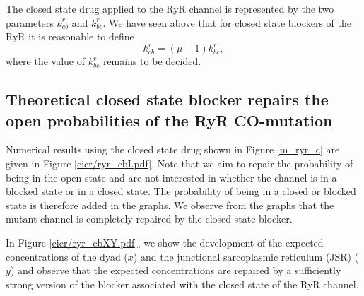 The closed state drug applied to the RyR channel is represented by the two
parameters $k_{cb}^{r}$ and $k_{bc}^{r}.$ We have seen above that for closed
state blockers of the RyR it is reasonable to define%
\[
k_{cb}^{r}=\left(  \mu-1\right)  k_{bc}^{r},%
\]
where the value of $k_{bc}^{r}$ remains to be decided. 

\subsection{Theoretical closed state blocker repairs the open probabilities of the RyR CO-mutation}

Numerical results using the closed state drug shown in Figure \ref{m_ryr_c} are given 
in Figure \ref{cicr/ryr_cbI.pdf}. Note that we aim to repair the probability of being in the open state and are not interested in whether the channel is in a blocked state or in a closed state. The probability of being in a closed or blocked state is therefore 
added in the graphs. We observe from the graphs that 
the mutant channel is completely repaired by the closed state blocker.

In Figure \ref{cicr/ryr_cbXY.pdf}, we show the development of the expected concentrations of the dyad ($x$) and the junctional sarcoplasmic reticulum  (JSR) ($y$) and observe that 
the expected concentrations are repaired by a sufficiently strong version of the blocker associated with the closed state of the RyR channel.





